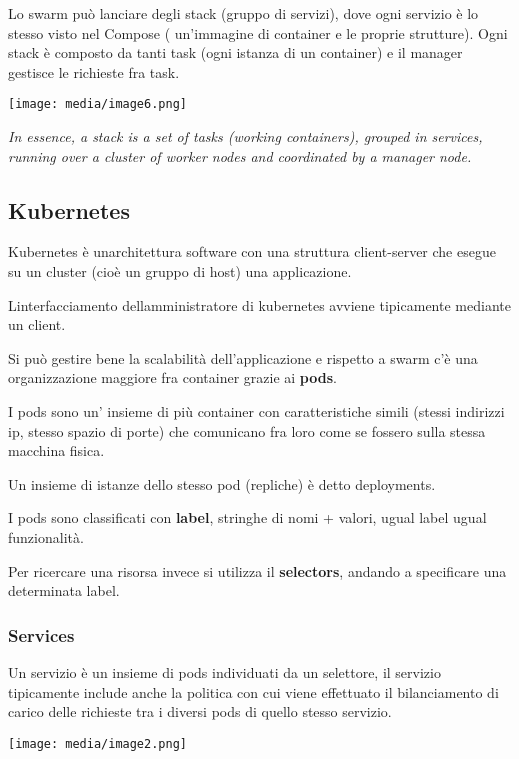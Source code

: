 Lo swarm può lanciare degli stack (gruppo di servizi), dove ogni
servizio è lo stesso visto nel Compose ( un'immagine di container e le
proprie strutture). Ogni stack è composto da tanti task (ogni istanza di
un container) e il manager gestisce le richieste fra task.

\texttt{[image: media/image6.png]}

\emph{In essence, a stack is a set of tasks (working containers),
grouped in services, running over a cluster of worker nodes and
coordinated by a manager node.}

\subsection{Kubernetes}\label{kubernetes-1}

Kubernetes è un\textquotesingle architettura software con una struttura
client-server che esegue su un cluster (cioè un gruppo di host) una
applicazione.

L\textquotesingle interfacciamento dell\textquotesingle amministratore
di kubernetes avviene tipicamente mediante un client.

Si può gestire bene la scalabilità dell'applicazione e rispetto a swarm
c'è una organizzazione maggiore fra container grazie ai \textbf{pods}.

I pods sono un' insieme di più container con caratteristiche simili
(stessi indirizzi ip, stesso spazio di porte) che comunicano fra loro
come se fossero sulla stessa macchina fisica.

Un insieme di istanze dello stesso pod (repliche) è detto deployments.

I pods sono classificati con \textbf{label}, stringhe di nomi + valori,
ugual label ugual funzionalità.

Per ricercare una risorsa invece si utilizza il \textbf{selectors},
andando a specificare una determinata label.

\subsubsection{Services}\label{services}

Un servizio è un insieme di pods individuati da un selettore, il
servizio tipicamente include anche la politica con cui viene effettuato
il bilanciamento di carico delle richieste tra i diversi pods di quello
stesso servizio.

\texttt{[image: media/image2.png]}

